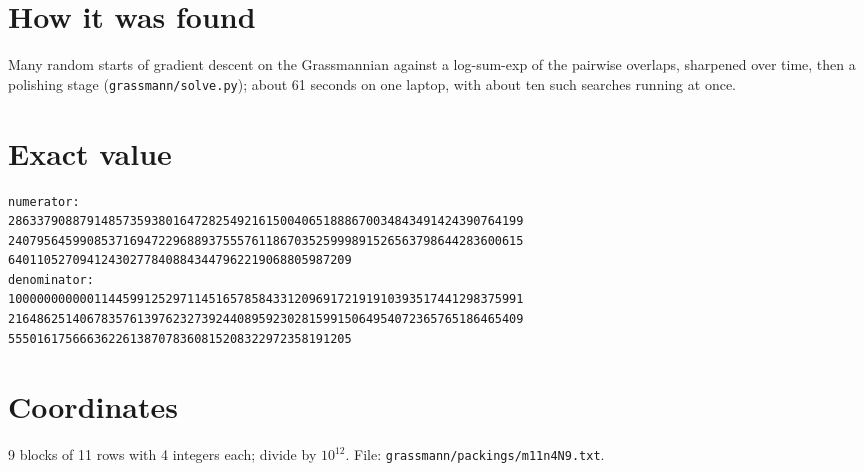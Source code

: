 \documentclass[11pt,a4paper]{article}
\begin{document}
\section{How it was found}
Many random starts of gradient descent on the Grassmannian against a log-sum-exp of the pairwise overlaps, sharpened over time, then a polishing stage (\texttt{grassmann/solve.py}); about 61 seconds on one laptop, with about ten such searches running at once.


\appendix
\section{Exact value}
{\small
\begin{verbatim}
numerator:
286337908879148573593801647282549216150040651888670034843491424390764199
240795645990853716947229688937555761186703525999891526563798644283600615
640110527094124302778408843447962219068805987209
denominator:
100000000000114459912529711451657858433120969172191910393517441298375991
216486251406783576139762327392440895923028159915064954072365765186465409
555016175666362261387078360815208322972358191205
\end{verbatim}}

\section{Coordinates}
9 blocks of 11 rows with 4 integers each; divide by $10^{12}$. File: \texttt{grassmann/packings/m11n4N9.txt}.
{\tiny
\begin{multicols}{3}
\end{multicols}}
\end{document}
